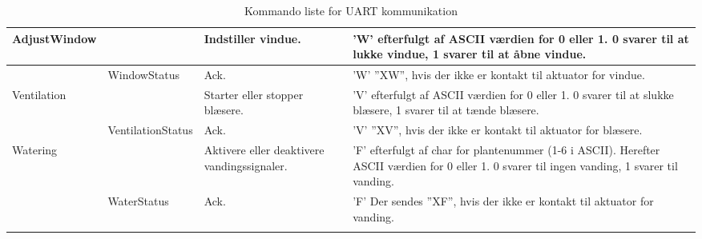 \begin{longtable}{| L{2.5cm} | L{2.3cm} | L{4cm} | >{\raggedright\arraybackslash}X |}
    AdjustWindow                      & ~                             & Indstiller vindue.                                  & ’W’ efterfulgt af ASCII værdien for 0 eller 1. 0 svarer til at lukke vindue, 1 svarer til at åbne vindue.                                                                                                                                    \\ \hline
    ~                                 & WindowStatus                  & Ack.                                                & ’W’ \newline ”XW”, hvis der ikke er kontakt til aktuator for vindue.                                                                                                                                                                                  \\ \hline
    Ventilation                       & ~                             & Starter eller stopper blæsere.                      & ’V’ efterfulgt af ASCII værdien for 0 eller 1. 0 svarer til at slukke blæsere, 1 svarer til at tænde blæsere.                                                                                                                                \\ \hline
    ~                                 & VentilationStatus             & Ack.                                                & ’V’ \newline ”XV”, hvis der ikke er kontakt til aktuator for blæsere.                                                                                                                                                                                 \\ \hline
    Watering                          & ~                             & Aktivere eller deaktivere vandingssignaler.         & ’F’ efterfulgt af char for plantenummer (1-6 i ASCII). Herefter ASCII værdien for 0 eller 1. 0 svarer til ingen vanding, 1 svarer til vanding.                                                                                                \\ \hline
    ~                                 & WaterStatus                   & Ack.                                                & ’F’ \newline Der sendes ”XF”, hvis der ikke er kontakt til aktuator for vanding.                                                                                                                                                                      \\ \hline
\caption{Kommando liste for UART kommunikation}
\label{tbl:kommando}
\end{longtable}